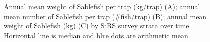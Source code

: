 \documentclass[12pt]{article}\usepackage[]{graphicx}\usepackage[]{color}
\begin{document}
\begin{figure}[htb]

{\centering {} 

}

\caption{Annual mean weight of Sablefish per trap (kg/trap) (A); annual mean number of Sablefish per trap (\#fish/trap) (B); annual mean weight of Sablefish (kg) (C) by StRS survey strata over time. Horizontal line is median and blue dots are arithmetic mean.}\label{fig:figure10}
\end{figure}
\clearpage
\end{document}
